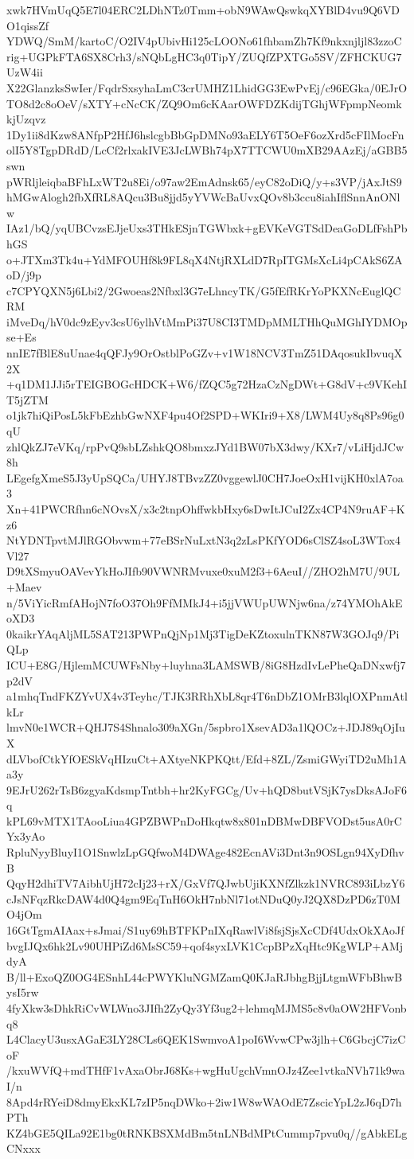 xwk7HVmUqQ5E7l04ERC2LDhNTz0Tmm+obN9WAwQswkqXYBlD4vu9Q6VDO1qissZf
YDWQ/SmM/kartoC/O2IV4pUbivHi125cLOONo61fhbamZh7Kf9nkxnjljl83zzoC
rig+UGPkFTA6SX8Crh3/sNQbLgHC3q0TipY/ZUQfZPXTGo5SV/ZFHCKUG7UzW4ii
X22GlanzksSwIer/FqdrSxsyhaLmC3crUMHZ1LhidGG3EwPvEj/c96EGka/0EJrO
TO8d2c8oOeV/sXTY+cNcCK/ZQ9Om6cKAarOWFDZKdijTGhjWFpmpNeomkkjUzqvz
1Dy1ii8dKzw8ANfpP2HfJ6hslcgbBbGpDMNo93aELY6T5OeF6ozXrd5cFIlMocFn
olI5Y8TgpDRdD/LcCf2rlxakIVE3JcLWBh74pX7TTCWU0mXB29AAzEj/aGBB5swn
pWRljleiqbaBFhLxWT2u8Ei/o97aw2EmAdnsk65/eyC82oDiQ/y+s3VP/jAxJtS9
hMGwAlogh2fbXfRL8AQcu3Bu8jjd5yYVWcBaUvxQOv8b3ccu8iahIflSnnAnONlw
IAz1/bQ/yqUBCvzsEJjeUxs3THkESjnTGWbxk+gEVKeVGTSdDeaGoDLfFshPbhGS
o+JTXm3Tk4u+YdMFOUHf8k9FL8qX4NtjRXLdD7RpITGMsXcLi4pCAkS6ZAoD/j9p
c7CPYQXN5j6Lbi2/2Gwoeas2Nfbxl3G7eLhncyTK/G5fEfRKrYoPKXNcEuglQCRM
iMveDq/hV0dc9zEyv3csU6ylhVtMmPi37U8CI3TMDpMMLTHhQuMGhIYDMOpse+Es
nnIE7fBlE8uUnae4qQFJy9OrOstblPoGZv+v1W18NCV3TmZ51DAqosukIbvuqX2X
+q1DM1JJi5rTEIGBOGcHDCK+W6/fZQC5g72HzaCzNgDWt+G8dV+c9VKehIT5jZTM
o1jk7hiQiPosL5kFbEzhbGwNXF4pu4Of2SPD+WKIri9+X8/LWM4Uy8q8Ps96g0qU
zhlQkZJ7eVKq/rpPvQ9sbLZshkQO8bmxzJYd1BW07bX3dwy/KXr7/vLiHjdJCw8h
LEgefgXmeS5J3yUpSQCa/UHYJ8TBvzZZ0vggewlJ0CH7JoeOxH1vijKH0xlA7oa3
Xn+41PWCRfhn6cNOvsX/x3c2tnpOhffwkbHxy6sDwItJCuI2Zx4CP4N9ruAF+Kz6
NtYDNTpvtMJlRGObvwm+77eBSrNuLxtN3q2zLsPKfYOD6sClSZ4soL3WTox4Vl27
D9tXSmyuOAVevYkHoJIfb90VWNRMvuxe0xuM2f3+6AeuI//ZHO2hM7U/9UL+Maev
n/5ViYicRmfAHojN7foO37Oh9FfMMkJ4+i5jjVWUpUWNjw6na/z74YMOhAkEoXD3
0kaikrYAqAljML5SAT213PWPnQjNp1Mj3TigDeKZtoxulnTKN87W3GOJq9/PiQLp
ICU+E8G/HjlemMCUWFsNby+luyhna3LAMSWB/8iG8HzdIvLePheQaDNxwfj7p2dV
a1mhqTndFKZYvUX4v3Teyhc/TJK3RRhXbL8qr4T6nDbZ1OMrB3lqlOXPnmAtlkLr
lmvN0e1WCR+QHJ7S4Shnalo309aXGn/5spbro1XsevAD3a1lQOCz+JDJ89qOjIuX
dLVbofCtkYfOESkVqHIzuCt+AXtyeNKPKQtt/Efd+8ZL/ZsmiGWyiTD2uMh1Aa3y
9EJrU262rTsB6zgyaKdsmpTntbh+hr2KyFGCg/Uv+hQD8butVSjK7ysDksAJoF6q
kPL69vMTX1TAooLiua4GPZBWPnDoHkqtw8x801nDBMwDBFVODst5usA0rCYx3yAo
RpluNyyBluyI1O1SnwlzLpGQfwoM4DWAge482EcnAVi3Dnt3n9OSLgn94XyDfhvB
QqyH2dhiTV7AibhUjH72cIj23+rX/GxVf7QJwbUjiKXNfZlkzk1NVRC893iLbzY6
cJsNFqzRkcDAW4d0Q4gm9EqTnH6OkH7nbNl71otNDuQ0yJ2QX8DzPD6zT0MO4jOm
16GtTgmAIAax+sJmai/S1uy69hBTFKPnIXqRawlVi8fsjSjsXcCDf4UdxOkXAoJf
bvgIJQx6hk2Lv90UHPiZd6MsSC59+qof4syxLVK1CcpBPzXqHtc9KgWLP+AMjdyA
B/ll+ExoQZ0OG4ESnhL44cPWYKluNGMZamQ0KJaRJbhgBjjLtgmWFbBhwBysI5rw
4fyXkw3sDhkRiCvWLWno3JIfh2ZyQy3Yf3ug2+lehmqMJMS5c8v0aOW2HFVonbq8
L4ClacyU3usxAGaE3LY28CLs6QEK1SwmvoA1poI6WvwCPw3jlh+C6GbcjC7izCoF
/kxuWVfQ+mdTHfF1vAxaObrJ68Ks+wgHuUgchVmnOJz4Zee1vtkaNVh71k9waI/n
8Apd4rRYeiD8dmyEkxKL7zIP5nqDWko+2iw1W8wWAOdE7ZscicYpL2zJ6qD7hPTh
KZ4bGE5QILa92E1bg0tRNKBSXMdBm5tnLNBdMPtCummp7pvu0q//gAbkELgCNxxx

